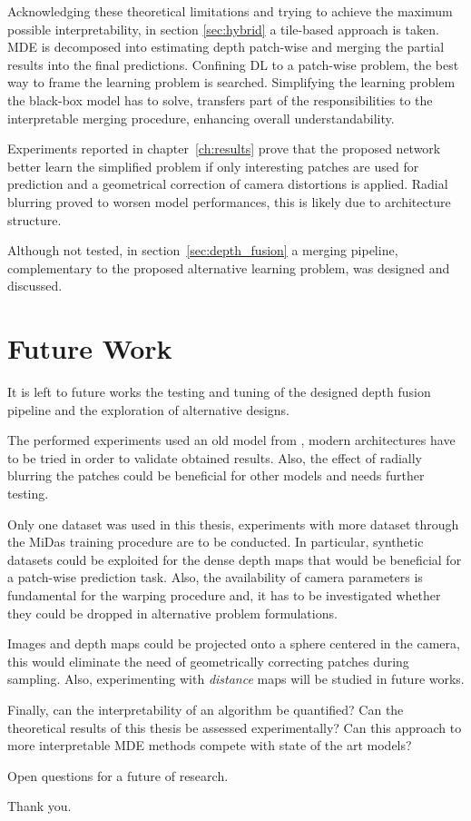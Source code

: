 Acknowledging these theoretical limitations and trying to achieve the maximum possible interpretability, in section \ref{sec:hybrid} a tile-based approach is taken.
MDE is decomposed into estimating depth patch-wise and merging the partial results into the final predictions.
Confining DL to a patch-wise problem, the best way to frame the learning problem is searched.
Simplifying the learning problem the black-box model has to solve, transfers part of the responsibilities to the interpretable merging procedure, enhancing overall understandability.

Experiments reported in chapter~\ref{ch:results} prove that the proposed network better learn the simplified problem if only interesting patches are used for prediction and a geometrical correction of camera distortions is applied.
Radial blurring proved to worsen model performances, this is likely due to architecture structure.

Although not tested, in section~\ref{sec:depth_fusion} a merging pipeline, complementary to the proposed alternative learning problem, was designed and discussed.

\section{Future Work}
It is left to future works the testing and tuning of the designed depth fusion pipeline and the exploration of alternative designs.

The performed experiments used an old model from \cite{Eigen}, modern architectures have to be tried in order to validate obtained results.
Also, the effect of radially blurring the patches could be beneficial for other models and needs further testing.

Only one dataset was used in this thesis, experiments with more dataset through the MiDas \cite{MiDas} training procedure are to be conducted.
In particular, synthetic datasets could be exploited for the dense depth maps that would be beneficial for a patch-wise prediction task.
Also, the availability of camera parameters is fundamental for the warping procedure and, it has to be investigated whether they could be dropped in alternative problem formulations.

Images and depth maps could be projected onto a sphere centered in the camera, this would eliminate the need of geometrically correcting patches during sampling.
Also, experimenting with \textit{distance} maps will be studied in future works.

Finally, can the interpretability of an algorithm be quantified?
Can the theoretical results of this thesis be assessed experimentally?
Can this approach to more interpretable MDE methods compete with state of the art models?

Open questions for a future of research.

\vfill

Thank you.